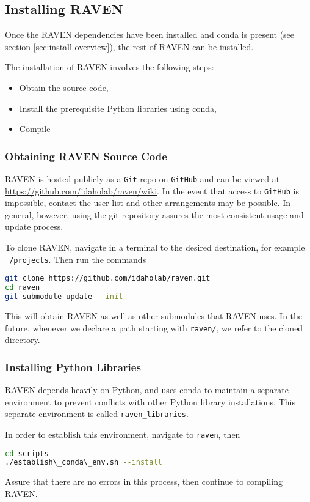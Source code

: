 \subsection{Installing RAVEN}
\label{sec:clone raven}

Once the RAVEN dependencies have been installed  and conda is present
(see section \ref{sec:install overview}), the rest of RAVEN can be installed.

The installation of RAVEN involves the following steps:
\begin{itemize}
  \item Obtain the source code,
  \item Install the prerequisite Python libraries using conda,
  \item Compile
\end{itemize}




\subsubsection{Obtaining RAVEN Source Code}
RAVEN is hosted publicly as a \texttt{Git} repo on \texttt{GitHub}
and can be viewed at \url{https://github.com/idaholab/raven/wiki}.
In the event that access to \texttt{GitHub} is impossible, contact the user list and other arrangements may be
possible.  In general, however, using the git repository assures the most consistent usage and update process.

To clone RAVEN, navigate in a terminal to the desired destination, for example \texttt{~/projects}.  Then run
the commands
\begin{lstlisting}[language=bash]
git clone https://github.com/idaholab/raven.git
cd raven
git submodule update --init
\end{lstlisting}
This will obtain RAVEN as well as other submodules that RAVEN uses.  In the future, whenever we declare a path
starting with \texttt{raven/}, we refer to the cloned directory.




\subsubsection{Installing Python Libraries}
RAVEN depends heavily on Python, and uses conda to maintain a separate environment to prevent conflicts with
other Python library installations.  This separate environment is called \texttt{raven\_libraries}.

In order to establish this environment, navigate to \texttt{raven}, then
\begin{lstlisting}[language=bash]
cd scripts
./establish\_conda\_env.sh --install
\end{lstlisting}
Assure that there are no errors in this process, then continue to compiling RAVEN.

